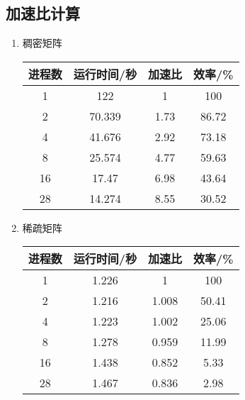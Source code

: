 \documentclass[UTF8,a4paper,12pt]{article}
\begin{document}
\subsection{加速比计算}
\begin{enumerate}[itemindent=0.5em,label=\arabic*、]
  \item 稠密矩阵
  \begin{center}
      \begin{tabular}{cccc}
      \hline
      进程数 & 运行时间/秒 & 加速比 & 效率/\%\\
      \hline
      1	& 122 & 1 & 100\\
      2	& 70.339 & 1.73 & 86.72\\
      4	& 41.676 & 2.92 & 73.18\\
      8	& 25.574 & 4.77 & 59.63\\
      16 & 17.47 & 6.98 & 43.64\\
      28 & 14.274 & 8.55 & 30.52\\
      \hline
      \end{tabular}
  \end{center}

  \begin{figure}[H]
  \centering
  \end{figure}

  \item 稀疏矩阵
  \begin{center}
      \begin{tabular}{cccc}
      \hline
      进程数 & 运行时间/秒 & 加速比 & 效率/\%\\
      \hline
      1 &	1.226	&	1	&	100\\
      2 &	1.216	&	1.008	&	50.41\\
      4 &	1.223	&	1.002	&	25.06\\
      8	&	1.278	&	0.959	&	11.99\\
      16 & 1.438 & 0.852 & 5.33\\
      28 & 1.467 & 0.836 & 2.98\\
      \hline
      \end{tabular}
  \end{center}

  \begin{figure}[H]
  \centering
  \end{figure}

\end{enumerate}
\end{document}

